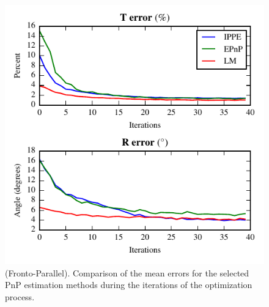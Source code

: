 \documentclass[letterpaper, 10 pt, conference]{ieeeconf}  %
\begin{document}
	\begin{figure}[t]
		\begin{center}
			\includegraphics[width=\columnwidth]{img/pose_together_fronto_parallel.pdf}
			\caption{\label{fig:FP_pnp_results_global}\small  (Fronto-Parallel). Comparison of the mean errors for the selected PnP estimation methods during the iterations of the optimization process.}
		\end{center}
		\vspace{-0.5cm}
	\end{figure}
	
\end{document}
